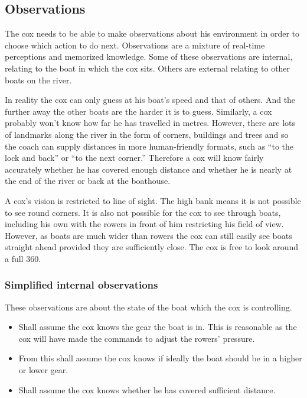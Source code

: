       \subsection{Observations} \label{model:cox:obs}
      The cox needs to be able to make observations about his environment in order to choose which action to do next. Observations are a mixture of real-time perceptions and memorized knowledge. Some of these observations are internal, relating to the boat in which the cox sits. Others are external relating to other boats on the river. 
      
      In reality the cox can only guess at his boat's speed and that of others. And the further away the other boats are the harder it is to guess. Similarly, a cox probably won't know how far he has travelled in metres. However, there are lots of landmarks along the river in the form of corners, buildings and trees and so the coach can supply distances in more human-friendly formats, such as ``to the lock and back'' or ``to the next corner.'' Therefore a cox will know fairly accurately whether he has covered enough distance and whether he is nearly at the end of the river or back at the boathouse.
      
      A cox's vision is restricted to line of sight. The high bank means it is not possible to see round corners. It is also not possible for the cox to see through boats, including his own with the rowers in front of him restricting his field of view. However, as boats are much wider than rowers the cox can still easily see boats straight ahead provided they are sufficiently close. The cox is free to look around a full 360\textdegree.
      
      \subsubsection{Simplified internal observations}
      These observations are about the state of the boat which the cox is controlling.
      \begin{itemize}
        \item Shall assume the cox knows the gear the boat is in. This is reasonable as the cox will have made the commands to adjust the rowers' pressure.
        \item From this shall assume the cox knows if ideally the boat should be in a higher or lower gear.
        \item Shall assume the cox knows whether he has covered sufficient distance.
      \end{itemize}
